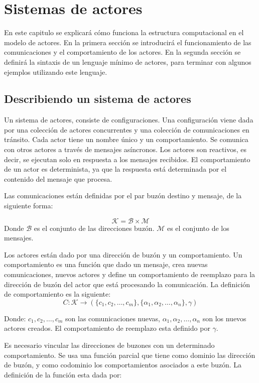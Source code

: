 \chapter{Sistemas de actores}

En este capitulo se explicará cómo funciona la estructura computacional en el modelo de actores. En la primera sección se introducirá el funcionamiento de las comunicaciones y el comportamiento de los actores. En la segunda sección se definirá la sintaxis de un lenguaje mínimo de actores, para terminar con algunos ejemplos utilizando este lenguaje.

\section{Describiendo un sistema de actores}
Un sistema de actores, consiste de configuraciones. Una configuración viene dada por una colección de actores concurrentes y una colección de comunicaciones en tránsito. Cada actor tiene un nombre único y un comportamiento. Se comunica con otros actores a través de mensajes asíncronos. Los actores son reactivos, es decir, se ejecutan solo en respuesta a los mensajes recibidos. El comportamiento de un actor es determinista, ya que la respuesta está determinada por el contenido del mensaje que procesa. 

Las comunicaciones están definidas por el par buzón destino y mensaje, de la siguiente forma:

\[
\mathcal{K} = \mathcal{B} \times \mathcal{M}
\]
Donde $\mathcal{B}$ es el conjunto de las direcciones buzón. $\mathcal{M}$ es el conjunto de los mensajes. 

Los actores están dado por una dirección de buzón y un comportamiento. Un comportamiento es una función que dado un mensaje, crea nuevas comunicaciones, nuevos actores y define un comportamiento de reemplazo para la dirección de buzón del actor que está procesando la comunicación. La definición de comportamiento es la siguiente:
\[
C : \mathcal{K} \rightarrow ( \{ c_1, c_2, \ldots, c_m \}, \{ \alpha_1, \alpha_2, \ldots, \alpha_n \}, \gamma )
\]

Donde: $c_1, c_2, \ldots, c_m$ son las comunicaciones nuevas, $\alpha_1, \alpha_2, \ldots, \alpha_n$ son los nuevos actores creados. El comportamiento de reemplazo esta definido por $\gamma$.

Es necesario vincular las direcciones de buzones con un determinado comportamiento. Se usa una función parcial que tiene como dominio las dirección de buzón, y como codominio los comportamientos asociados a este buzón. La definición de la función esta dada por:

